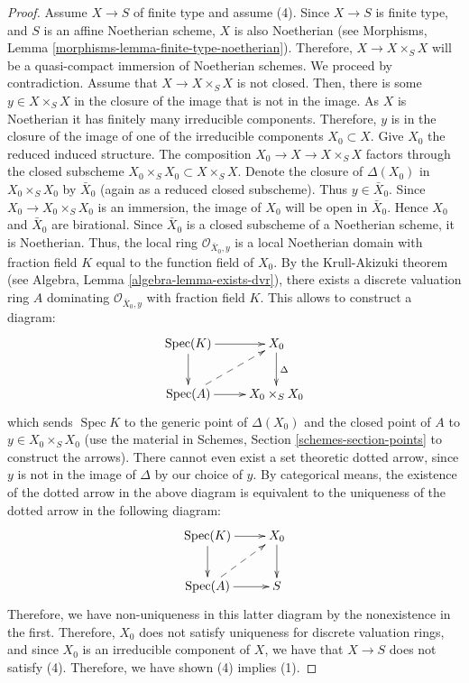 \documentclass[10pt,a4paper]{amsart}
\theoremstyle{plain}
\theoremstyle{definition}
\theoremstyle{remark}
\numberwithin{equation}{subsection}
\def\Spec{\mathop{\mathrm{Spec}}}
\begin{document}
\begin{proof}
\medskip\noindent
Assume $X \to S$ of finite type and assume (4).
Since $X \to S$ is finite type, and $S$ is an affine Noetherian
scheme, $X$ is also Noetherian (see
Morphisms, Lemma \ref{morphisms-lemma-finite-type-noetherian}).
Therefore, $X \to X \times_S X$ will
be a quasi-compact immersion of Noetherian schemes.  We proceed by
contradiction.  Assume that $X \to X \times_S X$ is not closed.  Then,
there is some $y \in X \times_S X$ in the closure of the image that is
not in the image. As $X$ is Noetherian it has finitely many irreducible
components. Therefore, $y$ is in the closure of the image of one of
the irreducible components $X_0 \subset X$.  Give $X_0$ the reduced
induced structure.  The composition $X_0 \to X \to X \times_S X$
factors through the closed subscheme $X_0 \times_S X_0 \subset X \times_S X$.
Denote the closure of $\Delta(X_0)$ in $X_0 \times_S X_0$
by $\bar X_0$ (again as a reduced closed subscheme). Thus $y \in \bar X_0$.
Since $X_0 \to X_0 \times_S X_0$ is an immersion, the image of $X_0$
will be open in $\bar X_0$. Hence $X_0$ and $\bar X_0$ are
birational. Since $\bar{X}_0$ is a closed subscheme of a
Noetherian scheme, it is Noetherian. Thus, the local ring
$\mathcal O_{{\bar X_0, y}}$ is a local Noetherian domain with fraction
field $K$ equal to the function field of $X_0$.  By the Krull-Akizuki
theorem (see Algebra, Lemma \ref{algebra-lemma-exists-dvr}), there exists a
discrete valuation ring $A$ dominating $\mathcal O_{{\bar X_0, y}}$
with fraction field $K$.  This allows to construct a diagram:
\begin{equation}
\label{equation-valuative-generic}
\xymatrix{
\Spec(K) \ar[r] \ar[d] & X_0 \ar[d]^{\Delta} \\
\Spec(A) \ar[r] \ar@{-->}[ur]& X_0 \times_S X_0 \\
}
\end{equation}
which sends $\Spec K$ to the generic point of $\Delta(X_0)$ and
the closed point of $A$ to $y \in X_0 \times_S X_0$ (use the material in
Schemes, Section \ref{schemes-section-points} to construct the arrows).
There cannot even exist
a set theoretic dotted arrow, since $y$ is not in the image of
$\Delta$ by our choice of $y$.  By categorical means, the existence of
the dotted arrow in the above diagram is equivalent to the uniqueness
of the dotted arrow in the following diagram:
\begin{equation}
\label{equation-valuative-nonexistent}
\xymatrix{
\Spec(K) \ar[r] \ar[d] & X_0 \ar[d]\\
\Spec(A) \ar[r] \ar@{-->}[ur] & S \\
}
\end{equation}
Therefore, we have non-uniqueness in this latter diagram by the
nonexistence in the first.  Therefore, $X_0$ does not satisfy
uniqueness for discrete valuation rings, and since $X_0$ is an
irreducible component of $X$, we have that $X \to S$ does not satisfy
(4).  Therefore, we have shown (4) implies (1).
\end{proof}
\end{document}
